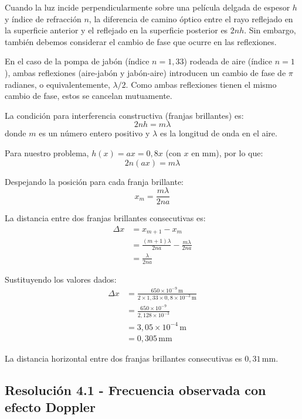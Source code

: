\documentclass[
  11pt,
  letterpaper,
   addpoints,
   answers
  ]{exam}
\begin{document}
\begin{questions}
\begin{solution}
Cuando la luz incide perpendicularmente sobre una película delgada de espesor $h$ y índice de refracción $n$, la diferencia de camino óptico entre el rayo reflejado en la superficie anterior y el reflejado en la superficie posterior es $2nh$. Sin embargo, también debemos considerar el cambio de fase que ocurre en las reflexiones.

En el caso de la pompa de jabón (índice $n = 1{,}33$) rodeada de aire (índice $n = 1$), ambas reflexiones (aire-jabón y jabón-aire) introducen un cambio de fase de $\pi$ radianes, o equivalentemente, $\lambda/2$. Como ambas reflexiones tienen el mismo cambio de fase, estos se cancelan mutuamente.

La condición para interferencia constructiva (franjas brillantes) es:
\begin{equation}
2nh = m\lambda
\end{equation}
donde $m$ es un número entero positivo y $\lambda$ es la longitud de onda en el aire.

Para nuestro problema, $h(x) = ax = 0{,}8x$ (con $x$ en mm), por lo que:
\begin{equation}
2n(ax) = m\lambda
\end{equation}

Despejando la posición para cada franja brillante:
\begin{equation}
x_m = \frac{m\lambda}{2na}
\end{equation}

La distancia entre dos franjas brillantes consecutivas es:
\begin{align}
\Delta x &= x_{m+1} - x_m \\
&= \frac{(m+1)\lambda}{2na} - \frac{m\lambda}{2na} \\
&= \frac{\lambda}{2na}
\end{align}

Sustituyendo los valores dados:
\begin{align}
\Delta x &= \frac{650 \times 10^{-9}\,\mathrm{m}}{2 \times 1{,}33 \times 0{,}8 \times 10^{-3}\,\mathrm{m}} \\
&= \frac{650 \times 10^{-9}}{2{,}128 \times 10^{-3}} \\
&= 3{,}05 \times 10^{-4}\,\mathrm{m} \\
&= 0{,}305\,\mathrm{mm}
\end{align}

La distancia horizontal entre dos franjas brillantes consecutivas es $\boxed{0{,}31\,\mathrm{mm}}$.

\subsection*{Resolución 4.1 - Frecuencia observada con efecto Doppler}


\end{solution}
\end{questions}
\end{document}

